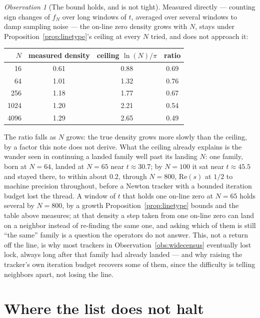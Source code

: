 \documentclass[10pt,a4paper]{article}
\theoremstyle{plain}
\theoremstyle{definition}
\theoremstyle{remark}
\newtheorem{observation}{Observation}
\begin{document}
\begin{observation}[The bound holds, and is not tight]
\label{obs:crowding}
Measured directly --- counting sign changes of \(f_N\) over long windows of \(t\), averaged over several windows to damp sampling noise --- the on-line zero density grows with \(N\), stays under Proposition~\ref{prop:linetype}'s ceiling at every \(N\) tried, and does not approach it:
\begin{center}
\begin{tabular}{rccc}
\(N\) & measured density & ceiling \(\ln(N)/\pi\) & ratio \\
\hline
16 & 0.61 & 0.88 & 0.69 \\
64 & 1.01 & 1.32 & 0.76 \\
256 & 1.18 & 1.77 & 0.67 \\
1024 & 1.20 & 2.21 & 0.54 \\
4096 & 1.29 & 2.65 & 0.49 \\
\end{tabular}
\end{center}
The ratio falls as \(N\) grows: the true density grows more slowly than the ceiling, by a factor this note does not derive.
What the ceiling already explains is the wander seen in continuing a landed family well past its landing \(N\): one family, born at \(N=64\), landed at \(N=65\) near \(t\approx30.7\); by \(N=100\) it sat near \(t\approx45.5\) and stayed there, to within about \(0.2\), through \(N=800\), \(\mathrm{Re}(s)\) at \(1/2\) to machine precision throughout, before a Newton tracker with a bounded iteration budget lost the thread.
A window of \(t\) that holds one on-line zero at \(N=65\) holds several by \(N=800\), by a growth Proposition~\ref{prop:linetype} bounds and the table above measures; at that density a step taken from one on-line zero can land on a neighbor instead of re-finding the same one, and asking which of them is still ``the same'' family is a question the operators do not answer.
This, not a return off the line, is why most trackers in Observation~\ref{obs:widecensus} eventually lost lock, always long after that family had already landed --- and why raising the tracker's own iteration budget recovers some of them, since the difficulty is telling neighbors apart, not losing the line.
\end{observation}

\section{Where the list does not halt}
\end{document}
